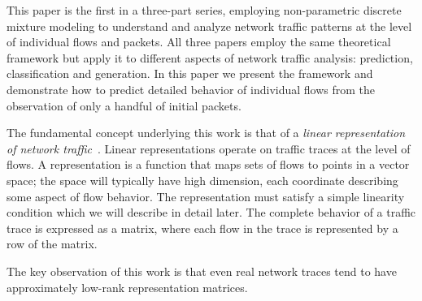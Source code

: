 \documentclass[conference]{IEEEtran}
\title{\vspace{-0.25em}\thetitle}
\author{
{\large{Stefan~Karpinski, John~R.~Gilbert, Elizabeth~M.~Belding}} \vspace{0.25em}\\
Department of Computer Science \\
University of California, Santa Barbara \vspace{0.35em}\\
\textit{\{sgk,gilbert,ebelding\}@cs.ucsb.edu}
}
\begin{document}
\maketitle


This paper is the first in a three-part series, employing non-parametric discrete mixture modeling to understand and analyze network traffic patterns at the level of individual flows and packets.\flownote
All three papers employ the same theoretical framework but apply it to different aspects of network traffic analysis: prediction, classification and generation.
In this paper we present the framework and demonstrate how to predict detailed behavior of individual flows from the observation of only a handful of initial packets.

The fundamental concept underlying this work is that of a \emph{linear representation of network traffic}~\cite{Karpinski08}.
Linear representations operate on traffic traces at the level of flows.
A representation is a function that maps sets of flows to points in a vector space;
the space will typically have high dimension, each coordinate describing some aspect of flow behavior.
The representation must satisfy a simple linearity condition which we will describe in detail later.
The complete behavior of a traffic trace is expressed as a matrix, where each flow in the trace is represented by a row of the matrix.


The key observation of this work is that even real network traces tend to have approximately low-rank representation matrices.


\end{document}
